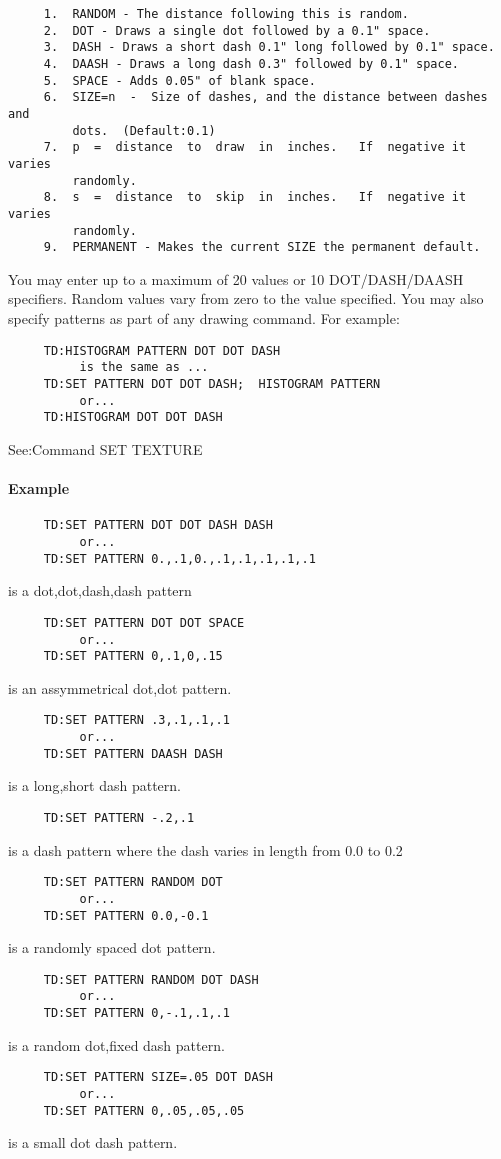 \begin{verbatim}
     1.  RANDOM - The distance following this is random.  
     2.  DOT - Draws a single dot followed by a 0.1" space.  
     3.  DASH - Draws a short dash 0.1" long followed by 0.1" space.  
     4.  DAASH - Draws a long dash 0.3" followed by 0.1" space.  
     5.  SPACE - Adds 0.05" of blank space.  
     6.  SIZE=n  -  Size of dashes, and the distance between dashes and
         dots.  (Default:0.1) 
     7.  p  =  distance  to  draw  in  inches.   If  negative it varies
         randomly.  
     8.  s  =  distance  to  skip  in  inches.   If  negative it varies
         randomly.  
     9.  PERMANENT - Makes the current SIZE the permanent default.  
\end{verbatim}

You  may  enter  up  to  a  maximum  of  20 values or 10 DOT/DASH/DAASH
specifiers.  Random values vary from zero to the value specified.   You
may also specify patterns as part of any drawing command.  For example: 
\begin{verbatim}
     TD:HISTOGRAM PATTERN DOT DOT DASH 
          is the same as ...  
     TD:SET PATTERN DOT DOT DASH;  HISTOGRAM PATTERN 
          or...  
     TD:HISTOGRAM DOT DOT DASH 
\end{verbatim}
See:Command SET TEXTURE 
\paragraph{Example}
\begin{verbatim}
     TD:SET PATTERN DOT DOT DASH DASH 
          or...  
     TD:SET PATTERN 0.,.1,0.,.1,.1,.1,.1,.1 
\end{verbatim}
is a dot,dot,dash,dash pattern 
\begin{verbatim}
     TD:SET PATTERN DOT DOT SPACE 
          or...  
     TD:SET PATTERN 0,.1,0,.15 
\end{verbatim}
is an assymmetrical dot,dot pattern.  
\begin{verbatim}
     TD:SET PATTERN .3,.1,.1,.1 
          or...  
     TD:SET PATTERN DAASH DASH 
\end{verbatim}
is a long,short dash pattern.  
\begin{verbatim}
     TD:SET PATTERN -.2,.1 
\end{verbatim}
is a dash pattern where the dash varies in length from 0.0 to 0.2 
\begin{verbatim}
     TD:SET PATTERN RANDOM DOT 
          or...  
     TD:SET PATTERN 0.0,-0.1 
\end{verbatim}
is a randomly spaced dot pattern.  
\begin{verbatim}
     TD:SET PATTERN RANDOM DOT DASH 
          or...  
     TD:SET PATTERN 0,-.1,.1,.1 
\end{verbatim}
is a random dot,fixed dash pattern.  
\begin{verbatim}
     TD:SET PATTERN SIZE=.05 DOT DASH 
          or...  
     TD:SET PATTERN 0,.05,.05,.05 
\end{verbatim}
is a small dot dash pattern.  
